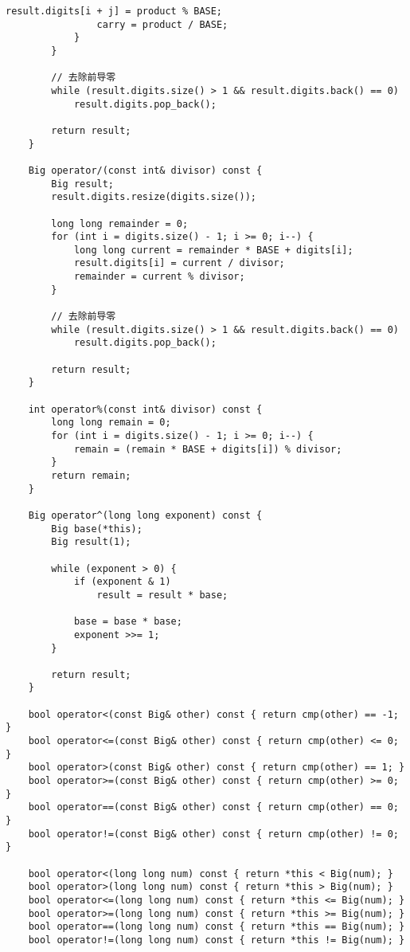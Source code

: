 \documentclass[UTF8]{article}
\begin{document}
\begin{lstlisting}[caption=压位高精度类]
                result.digits[i + j] = product % BASE;
                carry = product / BASE;
            }
        }
        
        // 去除前导零
        while (result.digits.size() > 1 && result.digits.back() == 0)
            result.digits.pop_back();
            
        return result;
    }

    Big operator/(const int& divisor) const {
        Big result;
        result.digits.resize(digits.size());
        
        long long remainder = 0;
        for (int i = digits.size() - 1; i >= 0; i--) {
            long long current = remainder * BASE + digits[i];
            result.digits[i] = current / divisor;
            remainder = current % divisor;
        }
        
        // 去除前导零
        while (result.digits.size() > 1 && result.digits.back() == 0)
            result.digits.pop_back();
            
        return result;
    }

    int operator%(const int& divisor) const {
        long long remain = 0;
        for (int i = digits.size() - 1; i >= 0; i--) {
            remain = (remain * BASE + digits[i]) % divisor;
        }
        return remain;
    }

    Big operator^(long long exponent) const {
        Big base(*this);
        Big result(1);
        
        while (exponent > 0) {
            if (exponent & 1) 
                result = result * base;
            
            base = base * base;
            exponent >>= 1;
        }
        
        return result;
    }

    bool operator<(const Big& other) const { return cmp(other) == -1; }
    bool operator<=(const Big& other) const { return cmp(other) <= 0; }
    bool operator>(const Big& other) const { return cmp(other) == 1; }
    bool operator>=(const Big& other) const { return cmp(other) >= 0; }
    bool operator==(const Big& other) const { return cmp(other) == 0; }
    bool operator!=(const Big& other) const { return cmp(other) != 0; }
    
    bool operator<(long long num) const { return *this < Big(num); }
    bool operator>(long long num) const { return *this > Big(num); }
    bool operator<=(long long num) const { return *this <= Big(num); }
    bool operator>=(long long num) const { return *this >= Big(num); }
    bool operator==(long long num) const { return *this == Big(num); }
    bool operator!=(long long num) const { return *this != Big(num); }
    

\end{lstlisting}
\end{document}
